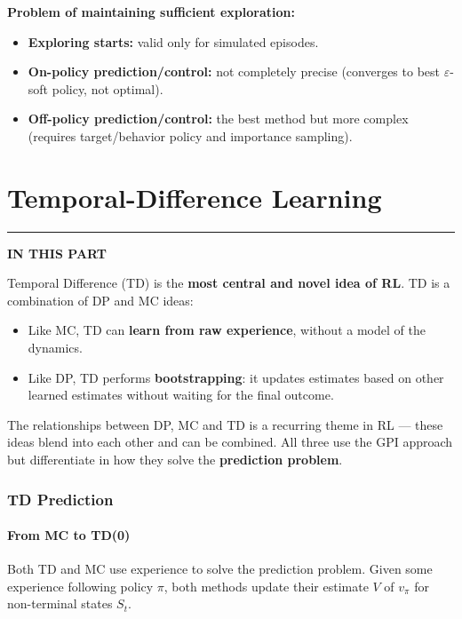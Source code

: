 \documentclass[11pt,a4paper]{article}
\theoremstyle{definition}
\theoremstyle{plain}
\theoremstyle{remark}
\newcommand{\partmtoc}{%
  \vspace{2pt}%
  {\color{rlrule}\rule{\linewidth}{0.5pt}}\par\vspace{3pt}%
  {\footnotesize\bfseries\color{rlaccent}IN THIS PART}\par\vspace{2pt}%
  \begingroup
  \etocsetnexttocdepth{subsection}%
  \localtableofcontents
  \endgroup
  \vspace{2pt}{\color{rlrule}\rule{\linewidth}{0.5pt}}\par\vspace{10pt}}
\begin{document}
\textbf{Problem of maintaining sufficient exploration:}
\begin{itemize}
    \item \textbf{Exploring starts:} valid only for simulated episodes.
    \item \textbf{On-policy prediction/control:} not completely precise (converges to best $\varepsilon$-soft policy, not optimal).
    \item \textbf{Off-policy prediction/control:} the best method but more complex (requires target/behavior policy and importance sampling).
\end{itemize}


\part{Temporal-Difference Learning}
\partmtoc

Temporal Difference (TD) is the \textbf{most central and novel idea of RL}. TD is a combination of DP and MC ideas:
\begin{itemize}
    \item Like MC, TD can \textbf{learn from raw experience}, without a model of the dynamics.
    \item Like DP, TD performs \textbf{bootstrapping}: it updates estimates based on other learned estimates without waiting for the final outcome.
\end{itemize}

The relationships between DP, MC and TD is a recurring theme in RL — these ideas blend into each other and can be combined. All three use the GPI approach but differentiate in how they solve the \textbf{prediction problem}.

\section{TD Prediction}

\subsection{From MC to TD(0)}

Both TD and MC use experience to solve the prediction problem. Given some experience following policy $\pi$, both methods update their estimate $V$ of $v_\pi$ for non-terminal states $S_t$.
\end{document}
